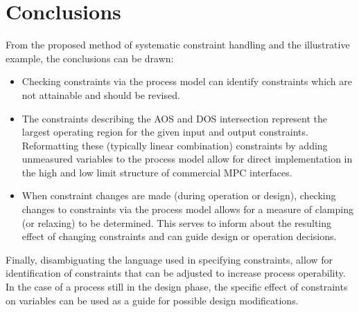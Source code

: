 \documentclass[final,authoryear,5pt,times,twocolumn]{elsarticle}
\begin{document}
\section{Conclusions}\label{sec:conclusions}
From the proposed method of systematic constraint handling and the illustrative example, the conclusions can be drawn:
\begin{itemize}
  \item Checking constraints via the process model can identify constraints which are not attainable and should be revised.
  \item The constraints describing the AOS and DOS intersection represent the largest operating region for the given input and output constraints.
Reformatting these (typically linear combination) constraints by adding unmeasured variables to the process model allow for direct implementation in the high and low limit structure of commercial MPC interfaces.
  \item When constraint changes are made (during operation or design), checking changes to constraints via the process model allows for a measure of clamping (or relaxing) to be determined.
This serves to inform about the resulting effect of changing constraints and can guide design or operation decisions.
\end{itemize}

Finally, disambiguating the language used in specifying constraints, allow for identification of constraints that can be adjusted to increase process operability.
In the case of a process still in the design phase, the specific effect of constraints on variables can be used as a guide for possible design modifications. 



\end{document}
